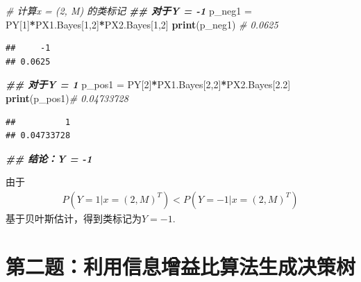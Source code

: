 \documentclass[
]{ctexart}
\newenvironment{Shaded}{\begin{snugshade}}{\end{snugshade}}
\newcommand{\CommentTok}[1]{\textcolor[rgb]{0.56,0.35,0.01}{\textit{#1}}}
\newcommand{\DecValTok}[1]{\textcolor[rgb]{0.00,0.00,0.81}{#1}}
\newcommand{\DocumentationTok}[1]{\textcolor[rgb]{0.56,0.35,0.01}{\textbf{\textit{#1}}}}
\newcommand{\FloatTok}[1]{\textcolor[rgb]{0.00,0.00,0.81}{#1}}
\newcommand{\FunctionTok}[1]{\textcolor[rgb]{0.13,0.29,0.53}{\textbf{#1}}}
\newcommand{\NormalTok}[1]{#1}
\newcommand{\OtherTok}[1]{\textcolor[rgb]{0.56,0.35,0.01}{#1}}
\newcommand{\SpecialCharTok}[1]{\textcolor[rgb]{0.81,0.36,0.00}{\textbf{#1}}}
\begin{document}
\begin{Shaded}
\begin{Highlighting}[]
\CommentTok{\# 计算x = (2, M)\textquotesingle{} 的类标记}
\DocumentationTok{\#\# 对于Y = {-}1}
\NormalTok{p\_neg1 }\OtherTok{=}\NormalTok{ PY[}\DecValTok{1}\NormalTok{]}\SpecialCharTok{*}\NormalTok{PX1.Bayes[}\DecValTok{1}\NormalTok{,}\DecValTok{2}\NormalTok{]}\SpecialCharTok{*}\NormalTok{PX2.Bayes[}\DecValTok{1}\NormalTok{,}\DecValTok{2}\NormalTok{]}
\FunctionTok{print}\NormalTok{(p\_neg1) }\CommentTok{\# 0.0625}
\end{Highlighting}
\end{Shaded}

\begin{verbatim}
##     -1 
## 0.0625
\end{verbatim}

\begin{Shaded}
\begin{Highlighting}[]
\DocumentationTok{\#\# 对于Y = 1 }
\NormalTok{p\_pos1 }\OtherTok{=}\NormalTok{ PY[}\DecValTok{2}\NormalTok{]}\SpecialCharTok{*}\NormalTok{PX1.Bayes[}\DecValTok{2}\NormalTok{,}\DecValTok{2}\NormalTok{]}\SpecialCharTok{*}\NormalTok{PX2.Bayes[}\FloatTok{2.2}\NormalTok{]}
\FunctionTok{print}\NormalTok{(p\_pos1)}\CommentTok{\# 0.04733728 }
\end{Highlighting}
\end{Shaded}

\begin{verbatim}
##          1 
## 0.04733728
\end{verbatim}

\begin{Shaded}
\begin{Highlighting}[]
\DocumentationTok{\#\# 结论：Y = {-}1}
\end{Highlighting}
\end{Shaded}

由于 \begin{align*}
P(Y=1|x=(2,M)^T) < P(Y=-1|x=(2,M)^T)
\end{align*} 基于贝叶斯估计，得到类标记为\(Y = -1\).

\hypertarget{ux7b2cux4e8cux9898ux5229ux7528ux4fe1ux606fux589eux76caux6bd4ux7b97ux6cd5ux751fux6210ux51b3ux7b56ux6811}{%
\section{第二题：利用信息增益比算法生成决策树}\label{ux7b2cux4e8cux9898ux5229ux7528ux4fe1ux606fux589eux76caux6bd4ux7b97ux6cd5ux751fux6210ux51b3ux7b56ux6811}}
\end{document}
